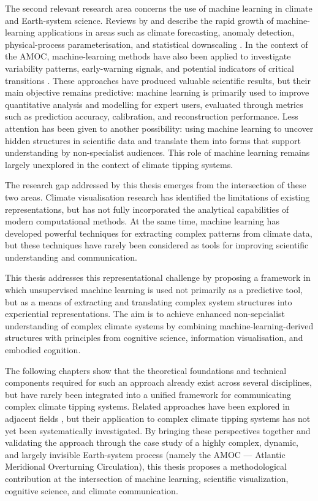 The second relevant research area concerns the use of machine learning in climate and Earth-system science. Reviews by \citet{reichstein2019} and \citet{sonnewald2021} describe the rapid growth of machine-learning applications in areas such as climate forecasting, anomaly detection, physical-process parameterisation, and statistical downscaling \citep{ham2019, weyn2020, rasp2018, vandal2019}. In the context of the AMOC, machine-learning methods have also been applied to investigate variability patterns, early-warning signals, and potential indicators of critical transitions \citep{boers2021, ditlevsen2023, benyami2024}. These approaches have produced valuable scientific results, but their main objective remains predictive: machine learning is primarily used to improve quantitative analysis and modelling for expert users, evaluated through metrics such as prediction accuracy, calibration, and reconstruction performance. Less attention has been given to another possibility: using machine learning to uncover hidden structures in scientific data and translate them into forms that support understanding by non-specialist audiences. This role of machine learning remains largely unexplored in the context of climate tipping systems.

The research gap addressed by this thesis emerges from the intersection of these two areas. Climate visualisation research has identified the limitations of existing representations, but has not fully incorporated the analytical capabilities of modern computational methods. At the same time, machine learning has developed powerful techniques for extracting complex patterns from climate data, but these techniques have rarely been considered as tools for improving scientific understanding and communication.

This thesis addresses this representational challenge by proposing a framework in which unsupervised machine learning is used not primarily as a predictive tool, but as a means of extracting and translating complex system structures into experiential representations. The aim is to achieve enhanced non-sepcialist understanding of complex climate systems by combining machine-learning-derived structures with principles from cognitive science, information visualisation, and embodied cognition. 

The following chapters show that the theoretical foundations and technical components required for such an approach already exist across several disciplines, but have rarely been integrated into a unified framework for communicating complex climate tipping systems. Related approaches have been explored in adjacent fields \citep{iten2020, sacha2018}, but their application to complex climate tipping systems has not yet been systematically investigated. By bringing these perspectives together and validating the approach through the case study of a highly complex, dynamic, and largely invisible Earth-system process (namely the AMOC --- Atlantic Meridional Overturning Circulation), this thesis proposes a methodological contribution at the intersection of machine learning, scientific visualization, cognitive science, and climate communication.

